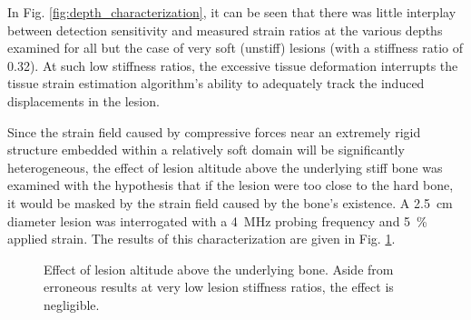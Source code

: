			In Fig. \ref{fig:depth_characterization}, it can be seen that there was little interplay between detection sensitivity and measured strain ratios at the various depths examined for all but the case of very soft (unstiff) lesions (with a stiffness ratio of 0.32). At such low stiffness ratios, the excessive tissue deformation interrupts the tissue strain estimation algorithm's ability to adequately track the induced displacements in the lesion.

			Since the strain field caused by compressive forces near an extremely rigid structure embedded within a relatively soft domain will be significantly heterogeneous, the effect of lesion altitude above the underlying stiff bone was examined with the hypothesis that if the lesion were too close to the hard bone, it would be masked by the strain field caused by the bone's existence. A \SI{2.5}{\cm} diameter lesion was interrogated with a \SI{4}{\MHz} probing frequency and \SI{5}{\percent} applied strain. The results of this characterization are given in Fig. \ref{fig:bottomsep_characterization}.

			\begin{figure}[!htb]
				\centering
				\caption[Quasi-static lesion altitude characterization]{Effect of lesion altitude above the underlying bone. Aside from erroneous results at very low lesion stiffness ratios, the effect is negligible.}
				\label{fig:bottomsep_characterization}
			\end{figure}

